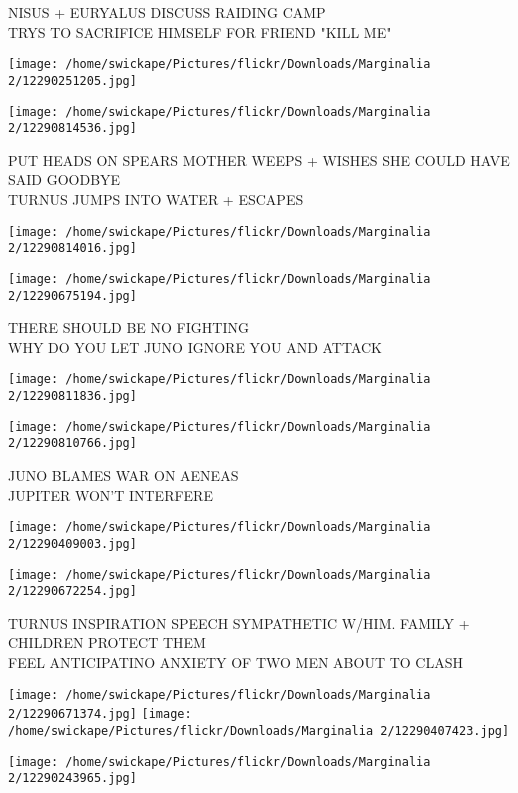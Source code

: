 \documentclass[10pt,letterpaper]{article}
\begin{document}
NISUS + EURYALUS DISCUSS RAIDING CAMP\\
TRYS TO SACRIFICE HIMSELF FOR FRIEND "KILL ME"
\pagebreak

\texttt{[image: /home/swickape/Pictures/flickr/Downloads/Marginalia 2/12290251205.jpg]}

\vspace{0.25in}
\texttt{[image: /home/swickape/Pictures/flickr/Downloads/Marginalia 2/12290814536.jpg]}

PUT HEADS ON SPEARS MOTHER WEEPS + WISHES SHE COULD HAVE SAID GOODBYE\\
TURNUS JUMPS INTO WATER + ESCAPES
\pagebreak

\texttt{[image: /home/swickape/Pictures/flickr/Downloads/Marginalia 2/12290814016.jpg]}

\vspace{0.25in}
\texttt{[image: /home/swickape/Pictures/flickr/Downloads/Marginalia 2/12290675194.jpg]}

THERE SHOULD BE NO FIGHTING\\
WHY DO YOU LET JUNO IGNORE YOU AND ATTACK
\pagebreak

\texttt{[image: /home/swickape/Pictures/flickr/Downloads/Marginalia 2/12290811836.jpg]}

\vspace{0.25in}
\texttt{[image: /home/swickape/Pictures/flickr/Downloads/Marginalia 2/12290810766.jpg]}

JUNO BLAMES WAR ON AENEAS\\
JUPITER WON'T INTERFERE
\pagebreak

\texttt{[image: /home/swickape/Pictures/flickr/Downloads/Marginalia 2/12290409003.jpg]}

\vspace{0.25in}
\texttt{[image: /home/swickape/Pictures/flickr/Downloads/Marginalia 2/12290672254.jpg]}

TURNUS INSPIRATION SPEECH SYMPATHETIC W/HIM. FAMILY + CHILDREN PROTECT THEM\\
FEEL ANTICIPATINO ANXIETY OF TWO MEN ABOUT TO CLASH
\pagebreak

\texttt{[image: /home/swickape/Pictures/flickr/Downloads/Marginalia 2/12290671374.jpg]}
\texttt{[image: /home/swickape/Pictures/flickr/Downloads/Marginalia 2/12290407423.jpg]}

\texttt{[image: /home/swickape/Pictures/flickr/Downloads/Marginalia 2/12290243965.jpg]}
\end{document}
